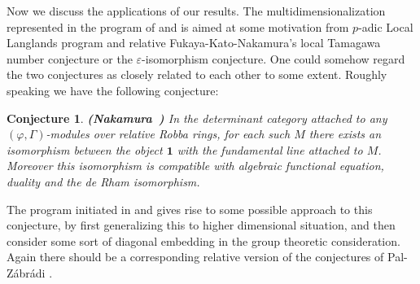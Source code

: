 \documentclass[12pt]{amsart}
\newtheorem{conjecture}[theorem]{Conjecture}
\theoremstyle{definition}
\numberwithin{equation}{section}
\begin{document}
\indent Now we discuss the applications of our results. The multidimensionalization represented in the program of \cite{PZ19} and \cite{CKZ18} is aimed at some motivation from $p$-adic Local Langlands program and relative Fukaya-Kato-Nakamura's local Tamagawa number conjecture or the $\varepsilon$-isomorphism conjecture. One could somehow regard the two conjectures as closely related to each other to some extent. Roughly speaking we have the following conjecture:

\begin{conjecture} \mbox{\bf (Nakamura \cite{Nak2})} In the determinant category attached to any $(\varphi,\Gamma)$-modules over relative Robba rings, for each such $M$ there exists an isomorphism between the object $\mathbf{1}$ with the fundamental line attached to $M$. Moreover this isomorphism is compatible with algebraic functional equation, duality and the de Rham isomorphism.
\end{conjecture}





The program initiated in \cite{PZ19} and \cite{CKZ18} gives rise to some possible approach to this conjecture, by first generalizing this to higher dimensional situation, and then consider some sort of diagonal embedding in the group theoretic consideration. Again there should be a corresponding relative version of the conjectures of Pal-Z\'abr\'adi \cite{PZ19}. \\
\end{document}
